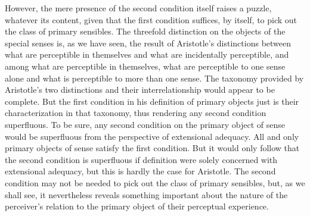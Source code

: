However, the mere presence of the second condition itself raises a puzzle, whatever its content, given that the first condition suffices, by itself, to pick out the class of primary sensibles. The threefold distinction on the objects of the special senses is, as we have seen, the result of Aristotle's distinctions between what are perceptible in themselves and what are incidentally perceptible, and among what are perceptible in themselves, what are perceptible to one sense alone and what is perceptible to more than one sense. The taxonomy provided by Aristotle's two distinctions and their interrelationship would appear to be complete. But the first condition in his definition of primary objects just is their characterization in that taxonomy, thus rendering any second condition superfluous. To be sure, any second condition on the primary object of sense would be superfluous from the perspective of extensional adequacy. All and only primary objects of sense satisfy the first condition. But it would only follow that the second condition is superfluous if definition were solely concerned with extensional adequacy, but this is hardly the case for Aristotle. The second condition may not be needed to pick out the class of primary sensibles, but, as we shall see, it nevertheless reveals something important about the nature of the perceiver's relation to the primary object of their perceptual experience.
% 

